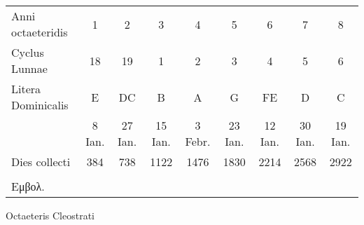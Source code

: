 %
\small
\centering
\setlength{\tabcolsep}{3pt}
\renewcommand{\arraystretch}{1.1}
\begin{tabular}{l cccccccc}
\hline
Anni octaeteridis &
1\super{†} & 2 & 3\super{†} & 4 & 5 & 6\super{†} & 7 & 8 \\
Cyclus Lunnae &
18 & 19 & 1 & 2 & 3 & 4 & 5 & 6 \\
Litera Dominicalis &
E & DC & B & A & G & FE & D & C \\
~ &
8 Ian. & 27 Ian. & 15 Ian. & 3 Febr. & 23 Ian. & 12 Ian. & 30 Ian. & 19 Ian. \\
Dies collecti &
384 &  738 & 1122 & 1476 & 1830 & 2214 & 2568 & 2922 \\
\hline
\\
\multicolumn{5}{l}{\footnotesize \super{†} \textgreek{Εμβολ.}}\\
\end{tabular}
%
\caption{Octaeteris Cleostrati}
\label{tab:p065}
%